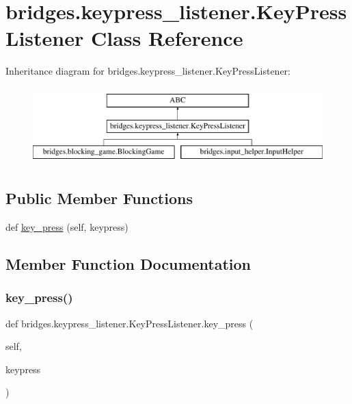 \hypertarget{classbridges_1_1keypress__listener_1_1_key_press_listener}{}\section{bridges.\+keypress\+\_\+listener.\+Key\+Press\+Listener Class Reference}
\label{classbridges_1_1keypress__listener_1_1_key_press_listener}
Inheritance diagram for bridges.\+keypress\+\_\+listener.\+Key\+Press\+Listener\+:\begin{figure}[H]
\begin{center}
\leavevmode
\includegraphics[height=3.000000cm]{classbridges_1_1keypress__listener_1_1_key_press_listener}
\end{center}
\end{figure}
\subsection*{Public Member Functions}
\begin{DoxyCompactItemize}
\item 
def \mbox{\hyperlink{classbridges_1_1keypress__listener_1_1_key_press_listener_a0a7b29de00fd412da075d30b8aa61f0d}{key\+\_\+press}} (self, keypress)
\end{DoxyCompactItemize}


\subsection{Member Function Documentation}
\mbox{\label{classbridges_1_1keypress__listener_1_1_key_press_listener_a0a7b29de00fd412da075d30b8aa61f0d}} 
\subsubsection{\texorpdfstring{key\_press()}{key\_press()}}
{\footnotesize\ttfamily def bridges.\+keypress\+\_\+listener.\+Key\+Press\+Listener.\+key\+\_\+press (\begin{DoxyParamCaption}\item[{}]{self,  }\item[{}]{keypress }\end{DoxyParamCaption})}



